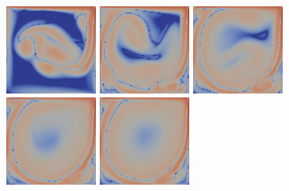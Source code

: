 \documentclass[english, nochinese]{pkupaper}
\begin{document}
\begin{figure}[htbp]
{{
\includegraphics[width=3cm]{Results/Figure02f.png}
\includegraphics[width=3cm]{Results/Figure02g.png}
\includegraphics[width=3cm]{Results/Figure02h.png}
\includegraphics[width=3cm]{Results/Figure02i.png}
\includegraphics[width=3cm]{Results/Figure02j.png}
}

}
\end{figure}
\end{document}
